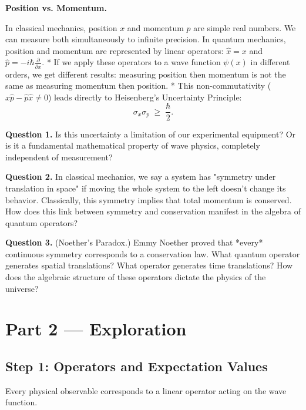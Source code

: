 \documentclass[12pt, a4paper, twoside]{book}
\begin{document}
\begin{puzzlebox}
\textbf{Position vs. Momentum.}

In classical mechanics, position $x$ and momentum $p$ are simple real numbers. We can measure both simultaneously to infinite precision. In quantum mechanics, position and momentum are represented by linear operators: $\hat{x} = x$ and $\hat{p} = -i\hbar\frac{\partial}{\partial x}$.
* If we apply these operators to a wave function $\psi(x)$ in different orders, we get different results: measuring position then momentum is not the same as measuring momentum then position.
* This non-commutativity ($\hat{x}\hat{p} - \hat{p}\hat{x} \neq 0$) leads directly to Heisenberg's Uncertainty Principle:
  \[
    \sigma_x \sigma_p \;\ge\; \frac{\hbar}{2}.
  \]

\medskip
\textbf{Question 1.} Is this uncertainty a limitation of our experimental equipment? Or is it a fundamental mathematical property of wave physics, completely independent of measurement?

\textbf{Question 2.} In classical mechanics, we say a system has "symmetry under translation in space" if moving the whole system to the left doesn't change its behavior. Classically, this symmetry implies that total momentum is conserved. How does this link between symmetry and conservation manifest in the algebra of quantum operators?

\textbf{Question 3.} (Noether's Paradox.) Emmy Noether proved that *every* continuous symmetry corresponds to a conservation law. What quantum operator generates spatial translations? What operator generates time translations? How does the algebraic structure of these operators dictate the physics of the universe?
\end{puzzlebox}

\newpage

\section{Part 2 --- Exploration}

\subsection{Step 1: Operators and Expectation Values}

Every physical observable corresponds to a linear operator acting on the wave function.
\end{document}

